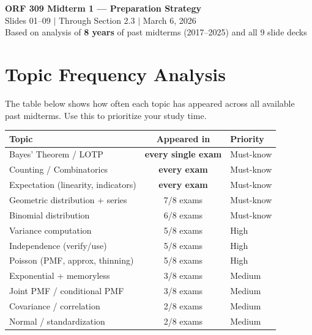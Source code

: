 \documentclass[11pt]{article}
\begin{document}
\begin{center}
{\LARGE\bfseries\color{accentblue} ORF 309 Midterm 1 --- Preparation Strategy}\\[6pt]
{\large Slides 01--09 $\mid$ Through Section 2.3 $\mid$ March 6, 2026}\\[4pt]
{\normalsize Based on analysis of \textbf{8 years} of past midterms (2017--2025) and all 9 slide decks}
\end{center}

\vspace{12pt}

\section{Topic Frequency Analysis}

The table below shows how often each topic has appeared across all available past midterms. Use this to prioritize your study time.

\vspace{6pt}
\begin{center}
\renewcommand{\arraystretch}{1.3}
\begin{tabular}{>{\raggedright\arraybackslash}p{5.5cm} c l}
\toprule
\textbf{Topic} & \textbf{Appeared in} & \textbf{Priority} \\
\midrule
\rowcolor{mustknow} Bayes' Theorem / LOTP & \textbf{every single exam} & Must-know \\
\rowcolor{mustknow} Counting / Combinatorics & \textbf{every exam} & Must-know \\
\rowcolor{mustknow} Expectation (linearity, indicators) & \textbf{every exam} & Must-know \\
\rowcolor{mustknow} Geometric distribution + series & 7/8 exams & Must-know \\
\rowcolor{mustknow} Binomial distribution & 6/8 exams & Must-know \\
\rowcolor{high} Variance computation & 5/8 exams & High \\
\rowcolor{high} Independence (verify/use) & 5/8 exams & High \\
\rowcolor{high} Poisson (PMF, approx, thinning) & 5/8 exams & High \\
\rowcolor{medium} Exponential + memoryless & 3/8 exams & Medium \\
\rowcolor{medium} Joint PMF / conditional PMF & 3/8 exams & Medium \\
\rowcolor{medium} Covariance / correlation & 2/8 exams & Medium \\
\rowcolor{medium} Normal / standardization & 2/8 exams & Medium \\
\bottomrule
\end{tabular}
\end{center}
\end{document}
